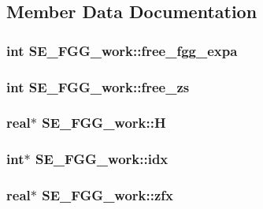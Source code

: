 \subsection{\-Member \-Data \-Documentation}
\hypertarget{structSE__FGG__work_a257c01a1f7af5016f26ab45f3f52ea6e}{
\subsubsection[{free\-\_\-fgg\-\_\-expa}]{\setlength{\rightskip}{0pt plus 5cm}int {\bf \-S\-E\-\_\-\-F\-G\-G\-\_\-work\-::free\-\_\-fgg\-\_\-expa}}}\label{structSE__FGG__work_a257c01a1f7af5016f26ab45f3f52ea6e}
\hypertarget{structSE__FGG__work_ace7dc175474b7cb63c36c75e7b0165d6}{
\subsubsection[{free\-\_\-zs}]{\setlength{\rightskip}{0pt plus 5cm}int {\bf \-S\-E\-\_\-\-F\-G\-G\-\_\-work\-::free\-\_\-zs}}}\label{structSE__FGG__work_ace7dc175474b7cb63c36c75e7b0165d6}
\hypertarget{structSE__FGG__work_a92e700c7b54315de4df2a0bd4c043188}{
\subsubsection[{\-H}]{\setlength{\rightskip}{0pt plus 5cm}real$\ast$ {\bf \-S\-E\-\_\-\-F\-G\-G\-\_\-work\-::\-H}}}\label{structSE__FGG__work_a92e700c7b54315de4df2a0bd4c043188}
\hypertarget{structSE__FGG__work_a7048725ea96be3c76588aad93e3e25d5}{
\subsubsection[{idx}]{\setlength{\rightskip}{0pt plus 5cm}int$\ast$ {\bf \-S\-E\-\_\-\-F\-G\-G\-\_\-work\-::idx}}}\label{structSE__FGG__work_a7048725ea96be3c76588aad93e3e25d5}
\hypertarget{structSE__FGG__work_ac3eb1da23813cc20c6f141f64eeb668d}{
\subsubsection[{zfx}]{\setlength{\rightskip}{0pt plus 5cm}real$\ast$ {\bf \-S\-E\-\_\-\-F\-G\-G\-\_\-work\-::zfx}}}\label{structSE__FGG__work_ac3eb1da23813cc20c6f141f64eeb668d}
